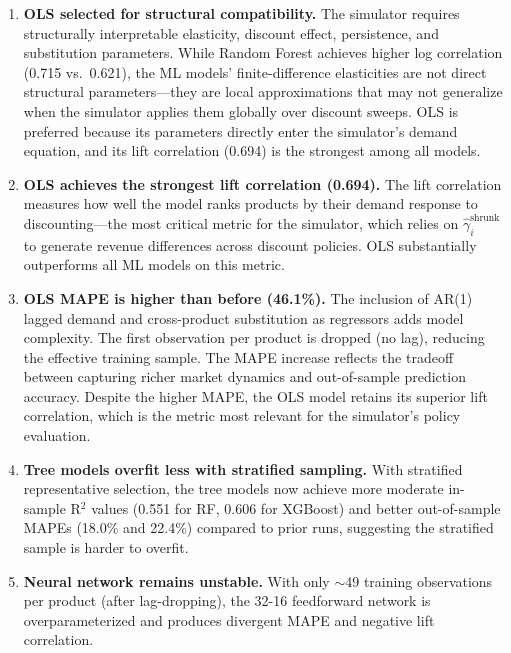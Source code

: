 \documentclass[12pt,a4paper]{article}
\begin{document}
\begin{enumerate}[nosep]
\item \textbf{OLS selected for structural compatibility.} The
simulator requires structurally interpretable elasticity, discount
effect, persistence, and substitution parameters. While Random
Forest achieves higher log correlation (0.715 vs.\ 0.621), the ML
models' finite-difference elasticities are not direct structural
parameters---they are local approximations that may not generalize
when the simulator applies them globally over discount sweeps. OLS
is preferred because its parameters directly enter the simulator's
demand equation, and its lift correlation (0.694) is the strongest
among all models.

\item \textbf{OLS achieves the strongest lift correlation (0.694).}
The lift correlation measures how well the model ranks products by
their demand response to discounting---the most critical metric for
the simulator, which relies on
$\hat{\gamma}_i^{\text{shrunk}}$ to generate revenue differences
across discount policies. OLS substantially outperforms all ML
models on this metric.

\item \textbf{OLS MAPE is higher than before (46.1\%).} The
inclusion of AR(1) lagged demand and cross-product substitution as
regressors adds model complexity. The first observation per product
is dropped (no lag), reducing the effective training sample. The
MAPE increase reflects the tradeoff between capturing richer market
dynamics and out-of-sample prediction accuracy. Despite the higher
MAPE, the OLS model retains its superior lift correlation, which is
the metric most relevant for the simulator's policy evaluation.

\item \textbf{Tree models overfit less with stratified sampling.}
With stratified representative selection, the tree models now
achieve more moderate in-sample R$^2$ values (0.551 for RF, 0.606
for XGBoost) and better out-of-sample MAPEs (18.0\% and 22.4\%)
compared to prior runs, suggesting the stratified sample is harder
to overfit.

\item \textbf{Neural network remains unstable.} With only
$\sim$49 training observations per product (after lag-dropping),
the 32-16 feedforward network is overparameterized and produces
divergent MAPE and negative lift correlation.
\end{enumerate}
\end{document}
